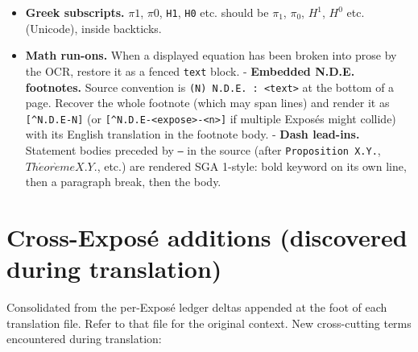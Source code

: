 \documentclass[
  11pt,
  a4paper,
]{book}
\providecommand{\tightlist}{%
  \setlength{\itemsep}{0pt}\setlength{\parskip}{0pt}}
\begin{document}
\begin{itemize}
  \begin{itemize}
  \tightlist
  \item
    \(Et(X)\) should be \(\hat{E}t(X)\) (the étale site / category of
    étale objects).
  \item
    \texttt{etale} should be \texttt{étale}.
  \item
    \texttt{Tohoku} should be \emph{Tôhoku}.
  \end{itemize}
\item
  \textbf{Greek subscripts.} \(\pi 1\), \(\pi 0\), \texttt{H1},
  \texttt{H0} etc. should be \(\pi_{1}\), \(\pi_{0}\), \(H^{1}\),
  \(H^{0}\) etc. (Unicode), inside backticks.
\item
  \textbf{Math run-ons.} When a displayed equation has been broken into
  prose by the OCR, restore it as a fenced
  \texttt{\textasciigrave{}\textasciigrave{}\textasciigrave{}text}
  block. - \textbf{Embedded N.D.E. footnotes.} Source convention is
  \texttt{(N)\ N.D.E.\ :\ \textless{}text\textgreater{}} at the bottom
  of a page. Recover the whole footnote (which may span lines) and
  render it as \texttt{{[}\^{}N.D.E-N{]}} (or
  \texttt{{[}\^{}N.D.E-\textless{}expose\textgreater{}-\textless{}n\textgreater{}{]}}
  if multiple Exposés might collide) with its English translation in the
  footnote body. - \textbf{Dash lead-ins.} Statement bodies preceded by
  \texttt{—} in the source (after \texttt{Proposition\ X.Y.},
  \(Th\acute{e}or\grave{e}me
  X.Y.\), etc.) are rendered SGA 1-style: bold keyword on its own line,
  then a paragraph break, then the body.
\end{itemize}

\section{Cross-Exposé additions (discovered during
translation)}\label{cross-exposuxe9-additions-discovered-during-translation}

Consolidated from the per-Exposé ledger deltas appended at the foot of
each translation file. Refer to that file for the original context. New
cross-cutting terms encountered during translation:
\end{document}
